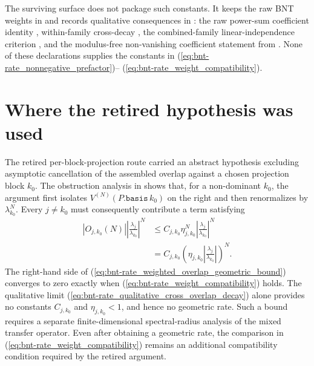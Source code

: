 \documentclass{article}
\begin{document}
The surviving  surface does not package such constants. It
keeps the raw BNT weights in  and records
qualitative consequences in
: the raw power-sum
coefficient identity ,
within-family cross-decay
, the
combined-family linear-independence criterion
, and the
modulus-free non-vanishing coefficient statement
 from
. None of these
declarations supplies the constants in
(\ref{eq:bnt-rate_nonnegative_prefactor})--%
(\ref{eq:bnt-rate_weight_compatibility}).

\section{Where the retired hypothesis was used}

The retired per-block-projection route carried an abstract hypothesis excluding
asymptotic cancellation of the assembled overlap against a chosen projection
block $k_0$. The obstruction analysis in
 shows that,
for a non-dominant $k_0$, the argument first isolates
$V^{(N)}(P.\mathtt{basis}\,k_0)$ on the right and then renormalizes by
$\lambda_{k_0}^N$. Every $j\ne k_0$ must consequently contribute a term
satisfying
\begin{align}
    |O_{j,k_0}(N)|
    \left|\frac{\lambda_j}{\lambda_{k_0}}\right|^N
        &\leq
        C_{j,k_0}\eta_{j,k_0}^N
        \left|\frac{\lambda_j}{\lambda_{k_0}}\right|^N
    \label{eq:bnt-rate_weighted_overlap_first_bound}\\
        &=
        C_{j,k_0}
        \left(\eta_{j,k_0}
            \left|\frac{\lambda_j}{\lambda_{k_0}}\right|\right)^N.
    \label{eq:bnt-rate_weighted_overlap_geometric_bound}
\end{align}
The right-hand side of
(\ref{eq:bnt-rate_weighted_overlap_geometric_bound}) converges to zero exactly
when (\ref{eq:bnt-rate_weight_compatibility}) holds. The qualitative limit
(\ref{eq:bnt-rate_qualitative_cross_overlap_decay}) alone provides no
constants $C_{j,k_0}$ and $\eta_{j,k_0}<1$, and hence no geometric rate. Such a
bound requires a separate finite-dimensional spectral-radius analysis of the
mixed transfer operator. Even after obtaining a geometric rate, the comparison
in (\ref{eq:bnt-rate_weight_compatibility}) remains an additional compatibility
condition required by the retired argument.
\end{document}
